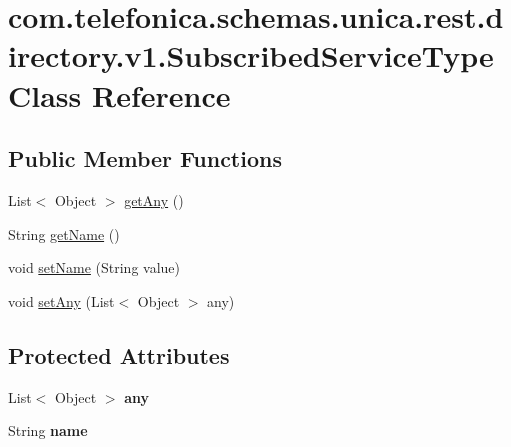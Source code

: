 \hypertarget{classcom_1_1telefonica_1_1schemas_1_1unica_1_1rest_1_1directory_1_1v1_1_1SubscribedServiceType}{
\section{com.telefonica.schemas.unica.rest.directory.v1.SubscribedServiceType Class Reference}
\label{classcom_1_1telefonica_1_1schemas_1_1unica_1_1rest_1_1directory_1_1v1_1_1SubscribedServiceType}
}
\subsection*{Public Member Functions}
\begin{DoxyCompactItemize}
\item 
List$<$ Object $>$ \hyperlink{classcom_1_1telefonica_1_1schemas_1_1unica_1_1rest_1_1directory_1_1v1_1_1SubscribedServiceType_ac344e9dfe9653ddf8a633c2c58dea7e1}{getAny} ()
\item 
String \hyperlink{classcom_1_1telefonica_1_1schemas_1_1unica_1_1rest_1_1directory_1_1v1_1_1SubscribedServiceType_adb5cf00f7ccb3bd514d9314e5ccf5baa}{getName} ()
\item 
void \hyperlink{classcom_1_1telefonica_1_1schemas_1_1unica_1_1rest_1_1directory_1_1v1_1_1SubscribedServiceType_a5647e63fb763a6faa5ad35fc08e5ce89}{setName} (String value)
\item 
void \hyperlink{classcom_1_1telefonica_1_1schemas_1_1unica_1_1rest_1_1directory_1_1v1_1_1SubscribedServiceType_a39003b9f9f1cd299b49d6d7802e3f3ca}{setAny} (List$<$ Object $>$ any)
\end{DoxyCompactItemize}
\subsection*{Protected Attributes}
\begin{DoxyCompactItemize}
\item 
\hypertarget{classcom_1_1telefonica_1_1schemas_1_1unica_1_1rest_1_1directory_1_1v1_1_1SubscribedServiceType_a1b7afea309f729c29eb0852fd110cb7c}{
List$<$ Object $>$ {\bfseries any}}
\label{classcom_1_1telefonica_1_1schemas_1_1unica_1_1rest_1_1directory_1_1v1_1_1SubscribedServiceType_a1b7afea309f729c29eb0852fd110cb7c}

\item 
\hypertarget{classcom_1_1telefonica_1_1schemas_1_1unica_1_1rest_1_1directory_1_1v1_1_1SubscribedServiceType_a338df5a43e5a45247e45dd1a4e4db946}{
String {\bfseries name}}
\label{classcom_1_1telefonica_1_1schemas_1_1unica_1_1rest_1_1directory_1_1v1_1_1SubscribedServiceType_a338df5a43e5a45247e45dd1a4e4db946}

\end{DoxyCompactItemize}


